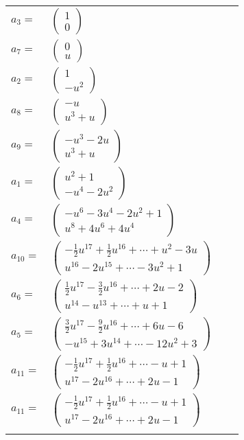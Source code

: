 \documentclass[1p]{elsarticle_modified}
\theoremstyle{definition}
\begin{document}
\begin{tabular}{m{7pt} m{180pt} m{7pt} m{180pt} }
\flushright $a_{3}=$&$\begin{pmatrix}1\\0\end{pmatrix}$ \\
\flushright $a_{7}=$&$\begin{pmatrix}0\\u\end{pmatrix}$ \\
\flushright $a_{2}=$&$\begin{pmatrix}1\\- u^2\end{pmatrix}$ \\
\flushright $a_{8}=$&$\begin{pmatrix}- u\\u^3+u\end{pmatrix}$ \\
\flushright $a_{9}=$&$\begin{pmatrix}- u^3-2 u\\u^3+u\end{pmatrix}$ \\
\flushright $a_{1}=$&$\begin{pmatrix}u^2+1\\- u^4-2 u^2\end{pmatrix}$ \\
\flushright $a_{4}=$&$\begin{pmatrix}- u^6-3 u^4-2 u^2+1\\u^8+4 u^6+4 u^4\end{pmatrix}$ \\
\flushright $a_{10}=$&$\begin{pmatrix}-\frac{1}{2} u^{17}+\frac{1}{2} u^{16}+\cdots+u^2-3 u\\u^{16}-2 u^{15}+\cdots-3 u^2+1\end{pmatrix}$ \\
\flushright $a_{6}=$&$\begin{pmatrix}\frac{1}{2} u^{17}-\frac{3}{2} u^{16}+\cdots+2 u-2\\u^{14}- u^{13}+\cdots+u+1\end{pmatrix}$ \\
\flushright $a_{5}=$&$\begin{pmatrix}\frac{3}{2} u^{17}-\frac{9}{2} u^{16}+\cdots+6 u-6\\- u^{15}+3 u^{14}+\cdots-12 u^2+3\end{pmatrix}$ \\
\flushright $a_{11}=$&$\begin{pmatrix}-\frac{1}{2} u^{17}+\frac{1}{2} u^{16}+\cdots- u+1\\u^{17}-2 u^{16}+\cdots+2 u-1\end{pmatrix}$\\ \flushright $a_{11}=$&$\begin{pmatrix}-\frac{1}{2} u^{17}+\frac{1}{2} u^{16}+\cdots- u+1\\u^{17}-2 u^{16}+\cdots+2 u-1\end{pmatrix}$\\&\end{tabular}
\end{document}
